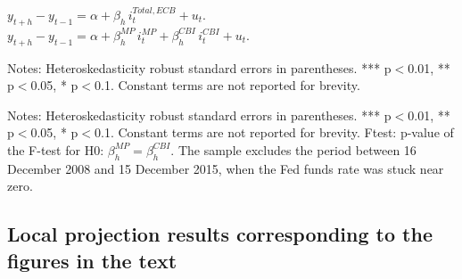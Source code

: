 \documentclass[a4paper,12pt]{article}
\newcommand{\pathTables}{../workm_lp/}
\begin{document}
\begin{table}[!htbp]
\begin{center}
\caption{The effect of ECB interest rate surprises and shocks on financial variables}\label{tab: reg ecb surp}
$y^{}_{t+h}-y^{}_{t-1} = \alpha + \beta_h\, i^{Total,ECB}_t + u_t.$\\
$y^{}_{t+h}-y^{}_{t-1} = \alpha + \beta^{MP}_h\, i^{MP}_t + \beta^{CBI}_h\, i^{CBI}_t + u_t.$
\small
{}
\end{center}\footnotesize
Notes: Heteroskedasticity robust standard errors in parentheses. *** p$<$0.01, ** p$<$0.05, * p$<$0.1.
Constant terms are not reported for brevity.
\end{table}



\begin{table}[!htbp]\small
\begin{center}
\caption{The effect of ECB monetary policy and information shocks on Fed funds futures, omitting the Zero Lower Bound period.}\label{tab: lp ecb shocks fff nozlb}
\end{center}
Notes: Heteroskedasticity robust standard errors in parentheses. *** p$<$0.01, ** p$<$0.05, * p$<$0.1.
Constant terms are not reported for brevity.
Ftest: p-value of the F-test for H0: $\beta^{MP}_h=\beta^{CBI}_h$.
The sample excludes the period between 16 December 2008 and 15 December 2015, when the Fed funds rate was stuck near zero.
\end{table}

\clearpage

\subsection{Local projection results corresponding to the figures in the text}
\end{document}
